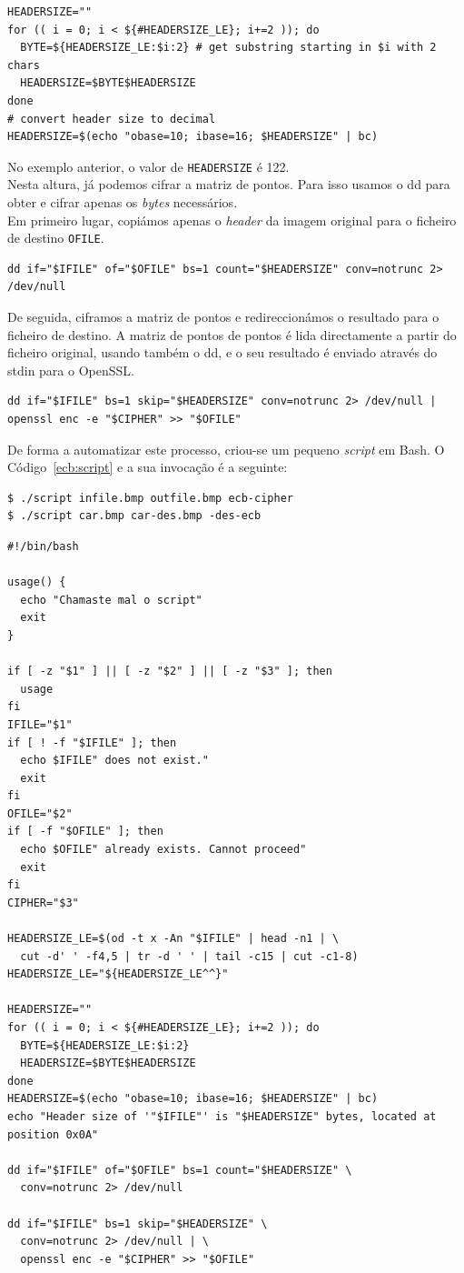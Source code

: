 \begin{lstlisting}[style=Bash]
HEADERSIZE=""
for (( i = 0; i < ${#HEADERSIZE_LE}; i+=2 )); do
  BYTE=${HEADERSIZE_LE:$i:2} # get substring starting in $i with 2 chars
  HEADERSIZE=$BYTE$HEADERSIZE
done
# convert header size to decimal
HEADERSIZE=$(echo "obase=10; ibase=16; $HEADERSIZE" | bc)
\end{lstlisting}
No exemplo anterior, o valor de \verb|HEADERSIZE| é 122.\\
Nesta altura, já podemos cifrar a matriz de pontos. Para isso usamos o \textsf{dd} para obter e cifrar apenas os \textit{bytes} necessários.\\
Em primeiro lugar, copiámos apenas o \textit{header} da imagem original para o ficheiro de destino \verb|OFILE|.
\begin{lstlisting}[style=bash]
dd if="$IFILE" of="$OFILE" bs=1 count="$HEADERSIZE" conv=notrunc 2> /dev/null
\end{lstlisting}
De seguida, ciframos a matriz de pontos e redireccionámos o resultado para o ficheiro de destino. A matriz de pontos de pontos é lida directamente a partir do ficheiro original, usando também o \textsf{dd}, e o seu resultado é enviado através do \textsf{stdin} para o \textsf{OpenSSL}.
\begin{lstlisting}[style=bash]
dd if="$IFILE" bs=1 skip="$HEADERSIZE" conv=notrunc 2> /dev/null | openssl enc -e "$CIPHER" >> "$OFILE"
\end{lstlisting}
De forma a automatizar este processo, criou-se um pequeno \textit{script} em \textsf{Bash}. O Código~\ref{ecb:script} e a sua invocação é a seguinte:
\begin{lstlisting}[style=Bash]
$ ./script infile.bmp outfile.bmp ecb-cipher
$ ./script car.bmp car-des.bmp -des-ecb
\end{lstlisting}
\begin{lstlisting}[style=Bash,caption={\textit{Script} utilizado para cifrar imagens com uma cifra por blocos.},label=ecb:script]
#!/bin/bash

usage() {
  echo "Chamaste mal o script"
  exit
}

if [ -z "$1" ] || [ -z "$2" ] || [ -z "$3" ]; then
  usage
fi
IFILE="$1"
if [ ! -f "$IFILE" ]; then
  echo $IFILE" does not exist."
  exit
fi
OFILE="$2"
if [ -f "$OFILE" ]; then
  echo $OFILE" already exists. Cannot proceed"
  exit
fi
CIPHER="$3"

HEADERSIZE_LE=$(od -t x -An "$IFILE" | head -n1 | \
  cut -d' ' -f4,5 | tr -d ' ' | tail -c15 | cut -c1-8)
HEADERSIZE_LE="${HEADERSIZE_LE^^}"

HEADERSIZE=""
for (( i = 0; i < ${#HEADERSIZE_LE}; i+=2 )); do
  BYTE=${HEADERSIZE_LE:$i:2}
  HEADERSIZE=$BYTE$HEADERSIZE
done
HEADERSIZE=$(echo "obase=10; ibase=16; $HEADERSIZE" | bc)
echo "Header size of '"$IFILE"' is "$HEADERSIZE" bytes, located at position 0x0A"

dd if="$IFILE" of="$OFILE" bs=1 count="$HEADERSIZE" \
  conv=notrunc 2> /dev/null

dd if="$IFILE" bs=1 skip="$HEADERSIZE" \
  conv=notrunc 2> /dev/null | \
  openssl enc -e "$CIPHER" >> "$OFILE"
\end{lstlisting}

